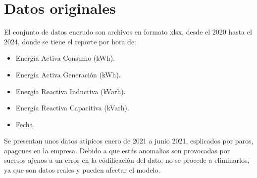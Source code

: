 \section{Datos originales}
El conjunto de datos encrudo son archivos en formato xlsx, desde el 2020 hasta el 2024, 
donde se tiene el reporte por hora de: 
\begin{itemize}
    \item Energ\'ia Activa Consumo (kWh).
    \item Energ\'ia Activa Generaci\'on (kWh).
    \item Energ\'ia Reactiva Inductiva (kVarh).
    \item Energ\'ia Reactiva Capacitiva (kVarh).
    \item Fecha.
\end{itemize}

Se presentan unos datos at\'ipicos enero de 2021 a junio 2021, esplicados por paros, apagones en la empresa.
Debido a que est\'as anomalias son provocadas por sucesos ajenos a un error en la c\'odificaci\'on del dato, no se procede a 
eliminarlos, ya que son datos reales y pueden afectar el modelo.

